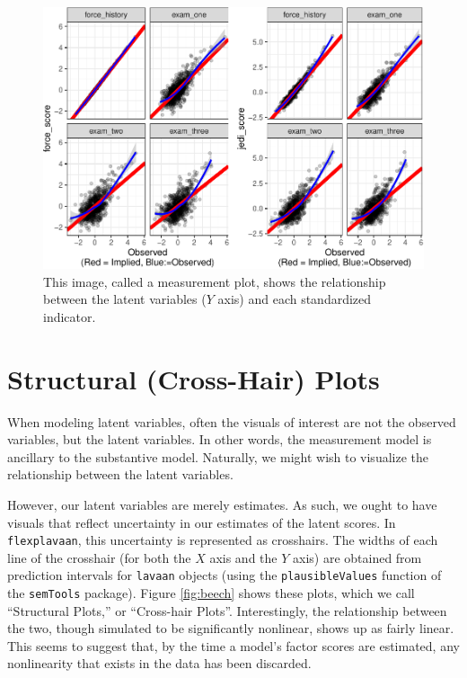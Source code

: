 \documentclass[
  english,
  doc]{apa6}
\begin{document}
\begin{figure}
\centering
\includegraphics{flexplavaan_draft_files/figure-latex/measurementplot-1.pdf}
\caption{\label{fig:measurementplot}This image, called a measurement plot, shows the relationship between the latent variables (\(Y\) axis) and each standardized indicator.}
\end{figure}

\hypertarget{structural-cross-hair-plots}{%
\section{Structural (Cross-Hair) Plots}\label{structural-cross-hair-plots}}

When modeling latent variables, often the visuals of interest are not the observed variables, but the latent variables. In other words, the measurement model is ancillary to the substantive model. Naturally, we might wish to visualize the relationship between the latent variables.

However, our latent variables are merely estimates. As such, we ought to have visuals that reflect uncertainty in our estimates of the latent scores. In \texttt{flexplavaan}, this uncertainty is represented as crosshairs. The widths of each line of the crosshair (for both the \(X\) axis and the \(Y\) axis) are obtained from prediction intervals for \texttt{lavaan} objects (using the \texttt{plausibleValues} function of the \texttt{semTools} package). Figure \ref{fig:beech} shows these plots, which we call ``Structural Plots,'' or ``Cross-hair Plots''. Interestingly, the relationship between the two, though simulated to be significantly nonlinear, shows up as fairly linear. This seems to suggest that, by the time a model's factor scores are estimated, any nonlinearity that exists in the data has been discarded.
\end{document}
